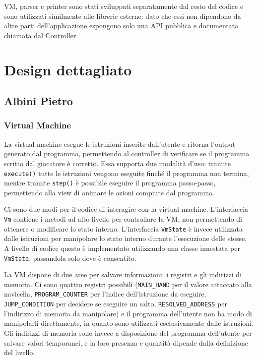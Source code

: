 VM, parser e printer sono stati sviluppati separatamente dal resto del
codice e sono utilizzati similmente alle librerie esterne: dato che essi
non dipendono da altre parti dell'applicazione espongono solo una API
pubblica e documentata chiamata dal Controller.

\section{Design dettagliato}

\subsection{Albini Pietro}

\subsubsection{Virtual Machine}

La virtual machine esegue le istruzioni inserite dall'utente e ritorna
l'output generato dal programma, permettendo al controller di verificare
se il programma scritto dal giocatore è corretto. Essa supporta due
modalità d'uso: tramite \texttt{execute()} tutte le istruzioni vengono
eseguite finché il programma non termina, mentre tramite \texttt{step()}
è possibile eseguire il programma passo-passo, permettendo alla view di
animare le azioni compiute dal programma.

Ci sono due modi per il codice di interagire con la virtual machine.
L'interfaccia \texttt{Vm} contiene i metodi ad alto livello per
controllare la VM, non permettendo di ottenere o modificare lo stato
interno. L'interfaccia \texttt{VmState} è invece utilizzata dalle
istruzioni per manipolare lo stato interno durante l'esecuzione delle
stesse. A livello di codice questo è implementato utilizzando una classe
innestata per \texttt{VmState}, passandola solo dove è consentito.

La VM dispone di due aree per salvare informazioni: i registri e gli
indirizzi di memoria. Ci sono quattro registri possibili
(\texttt{MAIN\_HAND} per il valore attaccato alla navicella,
\texttt{PROGRAM\_COUNTER} per l'indice dell'istruzione da eseguire,
\texttt{JUMP\_CONDITION} per decidere se eseguire un salto,
\texttt{RESOLVED\_ADDRESS} per l'indirizzo di memoria da manipolare) e
il programma dell'utente non ha modo di manipolarli direttamente, in
quanto sono utilizzati esclusivamente dalle istruzioni. Gli indirizzi di
memoria sono invece a disposizione del programma dell'utente per salvare
valori temporanei, e la loro presenza e quantità dipende dalla
definizione del livello.

